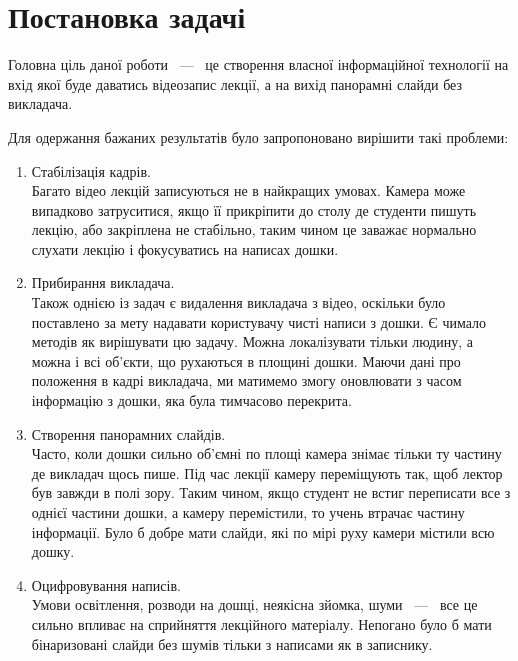 \section{Постановка задачі}

Головна ціль даної роботи ~---~ це створення власної інформаційної технології
на вхід якої буде даватись відеозапис лекції, а на вихід панорамні слайди
без викладача.

Для одержання бажаних результатів було запропоновано
вирішити такі проблеми:
\begin{enumerate}
	\item
	      Стабілізація кадрів.\\
	      Багато відео лекцій записуються не в найкращих умовах.
	      Камера може випадково затруситися, якщо її прикріпити до столу
	      де студенти пишуть лекцію, або закріплена не стабільно, таким чином
	      це заважає нормально слухати лекцію і фокусуватись на написах дошки.

	\item
	      Прибирання викладача.\\
	      Також однією із задач є видалення викладача з відео, оскільки
	      було поставлено за мету надавати користувачу чисті написи з дошки.
	      Є чимало методів як вирішувати цю задачу. Можна локалізувати тільки
	      людину, а можна і всі об'єкти, що рухаються в площині дошки. Маючи
	      дані про положення в кадрі викладача, ми матимемо змогу оновлювати
	      з часом інформацію з дошки, яка була тимчасово перекрита.

	\item
	      Створення панорамних слайдів.\\
	      Часто, коли дошки сильно об'ємні по площі камера знімає тільки ту частину де
	      викладач щось пише. Під час лекції камеру переміщують так, щоб лектор був завжди
	      в полі зору. Таким чином, якщо студент не встиг переписати все з однієї частини
	      дошки, а камеру перемістили, то учень втрачає частину інформації. Було б добре
	      мати слайди, які по мірі руху камери містили всю дошку.

	\item
	      Оцифровування написів. \\
	      Умови освітлення, розводи на дошці, неякісна зйомка, шуми ~---~ все це сильно впливає
	      на сприйняття лекційного матеріалу. Непогано було б мати бінаризовані слайди без
	      шумів тільки з написами як в записнику.
\end{enumerate}